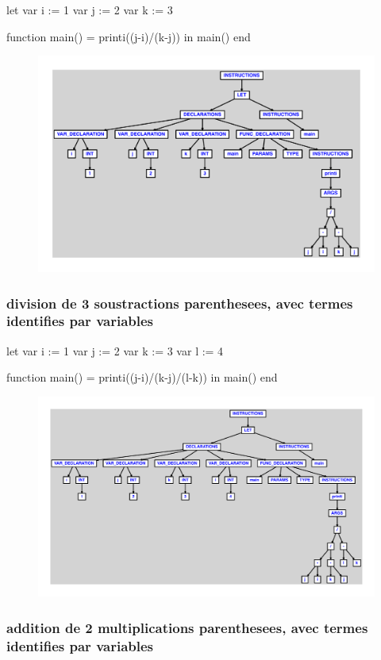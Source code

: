 \documentclass{article}
\begin{document}
\begin{verbatimtab}
let
	var i := 1
	var j := 2
	var k := 3

	function main() = printi((j-i)/(k-j))
in main() end
\end{verbatimtab}
\begin{figure}[H]\centering\includegraphics[max width=\textwidth]{ast/ast_129.pdf}\end{figure}\subsubsection{division de 3 soustractions parenthesees, avec termes identifies par variables}
\begin{verbatimtab}
let
	var i := 1
	var j := 2
	var k := 3
	var l := 4

	function main() = printi((j-i)/(k-j)/(l-k))
in main() end
\end{verbatimtab}
\begin{figure}[H]\centering\includegraphics[max width=\textwidth]{ast/ast_130.pdf}\end{figure}\subsubsection{addition de 2 multiplications parenthesees, avec termes identifies par variables}
\end{document}
